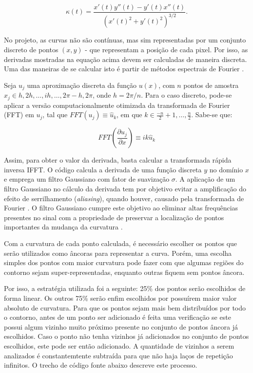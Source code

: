 \begin{equation}
	\kappa (t) = \frac{x'(t) y''(t) - y'(t) x''(t)}{(x'(t)^2 + y'(t)^2)^{3/2}}.
\end{equation}

No projeto, as curvas não são contínuas, mas sim representadas por um conjunto discreto de pontos $(x, y)$ - que representam a posição de cada pixel. Por isso, as derivadas mostradas na equação acima devem ser calculadas de maneira discreta. Uma das maneiras de se calcular isto é partir de métodos espectrais de Fourier \cite{brethwashington}.

Seja $u_j$ uma aproximação discreta da função $u(x)$, com $n$ pontos de amostra $x_j \in h, 2h, \dots, ih, \dots, 2\pi - h, 2\pi$, onde $h = 2\pi/n$. Para o caso discreto, pode-se aplicar a versão computacionalmente otimizada da transformada de Fourier (FFT) em $u_j$, tal que $FFT(u_j) \equiv \hat{u}_k$, em que $k \in \frac{-n}{2}+1, \dots, \frac{n}{2}$. Sabe-se que:

$$FFT \left (\frac{\partial u_j}{\partial x} \right) \equiv i k \hat{u}_k$$

Assim, para obter o valor da derivada, basta calcular a transformada rápida inversa IFFT. O código calcula a derivada de uma função discreta $y$ no domínio $x$ e emprega um filtro Gaussiano com fator de suavização $\sigma$. A aplicação de um filtro Gaussiano no cálculo da derivada tem por objetivo evitar a amplificação do efeito de serrilhamento (\textit{aliasing}), quando houver, causado pela transformada de Fourier \cite{li1987}. O filtro Gaussiano cumpre este objetivo ao eliminar altas frequências presentes no sinal com a propriedade de preservar a localização de pontos importantes da mudança da curvatura \cite{tomasi2007}.

Com a curvatura de cada ponto calculada, é necessário escolher os pontos que serão utilizados como âncoras para representar a curva. Porém, uma  escolha simples dos pontos com maior curvatura pode fazer com que algumas regiões do contorno sejam super-representadas, enquanto outras fiquem sem pontos âncora.

Por isso, a estratégia utilizada foi a seguinte: 25\% dos pontos serão escolhidos de forma linear. Os outros 75\% serão enfim escolhidos por possuírem maior valor absoluto de curvatura. Para que os pontos sejam mais bem distribuídos por todo o contorno, antes de um ponto ser adicionado é feita uma verificação se este possui algum vizinho muito próximo presente no conjunto de pontos âncora já escolhidos. Caso o ponto não tenha vizinhos já adicionados no conjunto de pontos escolhidos, este pode ser então adicionado. A quantidade de vizinhos a serem analizados é constantemtente subtraída para que não haja laços de repetição infinitos. O trecho de código fonte abaixo descreve este processo.


